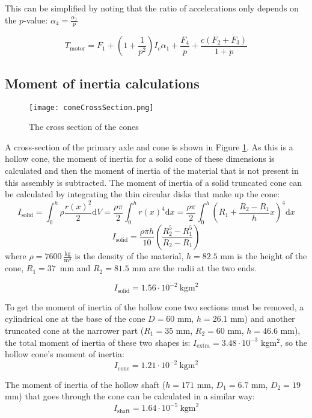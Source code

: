 \documentclass[12pt]{article}
\begin{document}
This can be simplified by noting that the ratio of accelerations only depends on the $p$-value: $\alpha_4 = \frac{\alpha_1}{p}$

$$T_{\text{motor}} = F_1 + \left(1+\frac{1}{p^2}\right)I_c\alpha_1 + \frac{F_4 }{p} + \frac{c(F_2+F_3)}{1+p}$$



\subsection{Moment of inertia calculations}
\label{sec:momentOfInertiaCalcs}


\begin{figure}[h]
    \centering
    \texttt{[image: coneCrossSection.png]}
    \caption{The cross section of the cones}
    \label{fig:coneCrossSection}
\end{figure}

A cross-section of the primary axle and cone is shown in Figure \ref{fig:coneCrossSection}. As this is a hollow cone, the moment of inertia for a solid cone of these dimensions is calculated and then the moment of inertia of the material that is not present in this assembly is subtracted.
The moment of inertia of a solid truncated cone can be calculated by integrating the thin circular disks that make up the cone:
$$I_{\text{solid}} = \int_0^h \rho \frac{r(x)^2}{2} \text{d}V = \frac{\rho \pi }{2} \int_0^h r(x)^4 \text{d}x =\frac{\rho \pi }{2} \int_0^h \left( R_1 + \frac{R_2-R_1}{h}x \right)^4 \text{d}x $$
$$I_{\text{solid}} = \frac{\rho \pi h }{10}\left( \frac{R_2^5-R_1^5}{R_2-R_1}\right)$$
where $\rho = 7600~\frac{\text{kg}}{\text{m}^3}$  is the density of the material, $h = 82.5 $ mm is the height of the cone, $R_1 = 37$~mm and $R_2 = 81.5$ mm are the radii at the two ends. 

$$I_{\text{solid}} = 1.56 \cdot 10^{-2}~\text{kgm}^2$$

To get the moment of inertia of the hollow cone two sections must be removed, a cylindrical one at the base of the cone $D=60$ mm, $h=26.1$ mm) and another truncated cone at the narrower part ($R_1=35$ mm, $R_2=60$ mm, $h=46.6$ mm), the total moment of inertia of these two shapes is: $I_{\text{extra}} = 3.48\cdot 10^{-3}$ kgm$^2$, so the hollow cone's moment of inertia:
$$I_{\text{cone}} = 1.21\cdot 10^{-2}~\text{kgm}^2$$

The moment of inertia of the hollow shaft ($h=171$ mm, $D_1=6.7$ mm, $D_2=19$ mm) that goes through the cone can be calculated in a similar way: 
$$I_{\text{shaft}} = 1.64\cdot 10^{-5}~\text{kgm}^2$$ 
\end{document}

